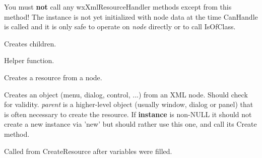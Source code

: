 
You must {\bf not} call any wxXmlResourceHandler methods except 
 from this method! The instance
is not yet initialized with node data at the time CanHandle is called and it is only
safe to operate on {\it node} directly or to call IsOfClass.

\label{wxxmlresourcehandlercreatechildren}


Creates children.

\label{wxxmlresourcehandlercreatechildrenprivately}


Helper function.

\label{wxxmlresourcehandlercreateresfromnode}


Creates a resource from a node.

\label{wxxmlresourcehandlercreateresource}


Creates an object (menu, dialog, control, ...) from an XML node.
Should check for validity. {\it parent} is a higher-level object (usually window, dialog or panel)
that is often necessary to create the resource.
If {\bf instance} is non-NULL it should not create a new instance via 'new' but
should rather use this one, and call its Create method.

\label{wxxmlresourcehandlerdocreateresource}


Called from CreateResource after variables
were filled.

\label{wxxmlresourcehandlergetbitmap}


